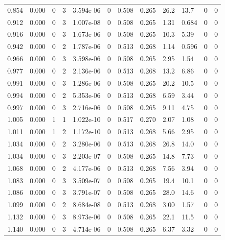 \documentclass[preview]{standalone}
\begin{document}
{{{\begin{tabular}{L{1.2cm}C{1.2cm} C{0.3cm}C{0.5cm} C{1.4cm}C{1.4cm} C{1.4cm}C{1.4cm} C{1.6cm}C{1.6cm} C{1.6cm}C{1.6cm}}
  0.854  &  0.000  & 0     &  3 &  3.594e-06  & 0  &  0.508&   0.265& 26.2 & 13.7   &  0 & 0  \\ 
  0.912  &  0.000  & 0     &  3 &  1.007e-08  & 0  &  0.508&   0.265& 1.31 & 0.684   &  0 & 0  \\ 
  0.916  &  0.000  & 0     &  3 &  1.673e-06  & 0  &  0.508&   0.265& 10.3 & 5.39   &  0 & 0  \\ 
  0.942  &  0.000  & 0     &  2 &  1.787e-06  & 0  &  0.513&   0.268& 1.14 & 0.596   &  0 & 0  \\ 
  0.966  &  0.000  & 0     &  3 &  3.598e-06  & 0  &  0.508&   0.265& 2.95 & 1.54   &  0 & 0  \\ 
  0.977  &  0.000  & 0     &  2 &  2.136e-06  & 0  &  0.513&   0.268& 13.2 & 6.86   &  0 & 0  \\ 
  0.991  &  0.000  & 0     &  3 &  1.286e-06  & 0  &  0.508&   0.265& 20.2 & 10.5   &  0 & 0  \\ 
  0.994  &  0.000  & 0     &  2 &  5.353e-06  & 0  &  0.513&   0.268& 6.59 & 3.44   &  0 & 0  \\ 
  0.997  &  0.000  & 0     &  3 &  2.716e-06  & 0  &  0.508&   0.265& 9.11 & 4.75   &  0 & 0  \\ 
  1.005  &  0.000  & 1     &  1 &  1.022e-10  & 0  &  0.517&   0.270& 2.07 & 1.08   &  0 & 0  \\ 
  1.011  &  0.000  & 1     &  2 &  1.172e-10  & 0  &  0.513&   0.268& 5.66 & 2.95   &  0 & 0  \\ 
  1.034  &  0.000  & 0     &  2 &  3.280e-06  & 0  &  0.513&   0.268& 26.8 & 14.0   &  0 & 0  \\ 
  1.034  &  0.000  & 0     &  3 &  2.203e-07  & 0  &  0.508&   0.265& 14.8 & 7.73   &  0 & 0  \\ 
  1.068  &  0.000  & 0     &  2 &  4.177e-06  & 0  &  0.513&   0.268& 7.56 & 3.94   &  0 & 0  \\ 
  1.083  &  0.000  & 0     &  3 &  3.509e-07  & 0  &  0.508&   0.265& 19.4 & 10.1   &  0 & 0  \\ 
  1.086  &  0.000  & 0     &  3 &  3.791e-07  & 0  &  0.508&   0.265& 28.0 & 14.6   &  0 & 0  \\ 
  1.099  &  0.000  & 0     &  2 &  8.684e-08  & 0  &  0.513&   0.268& 3.00 & 1.57   &  0 & 0  \\ 
  1.132  &  0.000  & 0     &  3 &  8.973e-06  & 0  &  0.508&   0.265& 22.1 & 11.5   &  0 & 0  \\ 
  1.140  &  0.000  & 0     &  3 &  4.714e-06  & 0  &  0.508&   0.265& 6.37 & 3.32   &  0 & 0  \\ 

\end{tabular}}}}
\end{document}
